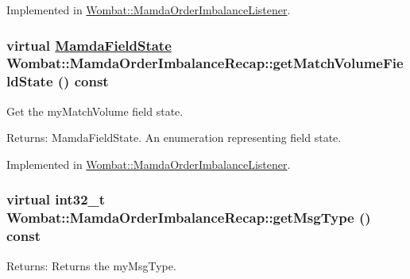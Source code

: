 Implemented in \hyperlink{classWombat_1_1MamdaOrderImbalanceListener_db5df0bb4c22c84ef0572046aaf98220}{Wombat::Mamda\-Order\-Imbalance\-Listener}.\hypertarget{classWombat_1_1MamdaOrderImbalanceRecap_f634674460d3c12123544852fcda939c}{
\subsubsection[getMatchVolumeFieldState]{\setlength{\rightskip}{0pt plus 5cm}virtual \hyperlink{namespaceWombat_93aac974f2ab713554fd12a1fa3b7d2a}{Mamda\-Field\-State} Wombat::Mamda\-Order\-Imbalance\-Recap::get\-Match\-Volume\-Field\-State () const}}
\label{classWombat_1_1MamdaOrderImbalanceRecap_f634674460d3c12123544852fcda939c}


Get the my\-Match\-Volume field state. 

\begin{Desc}
\item[Returns:]Mamda\-Field\-State. An enumeration representing field state. \end{Desc}


Implemented in \hyperlink{classWombat_1_1MamdaOrderImbalanceListener_bbba7d810e3b01e9b2041d3a0e0e517d}{Wombat::Mamda\-Order\-Imbalance\-Listener}.\hypertarget{classWombat_1_1MamdaOrderImbalanceRecap_45cda967241f1a5ff39a115c1395d06b}{
\subsubsection[getMsgType]{\setlength{\rightskip}{0pt plus 5cm}virtual int32\_\-t Wombat::Mamda\-Order\-Imbalance\-Recap::get\-Msg\-Type () const}}
\label{classWombat_1_1MamdaOrderImbalanceRecap_45cda967241f1a5ff39a115c1395d06b}


\begin{Desc}
\item[Returns:]Returns the my\-Msg\-Type. \end{Desc}


